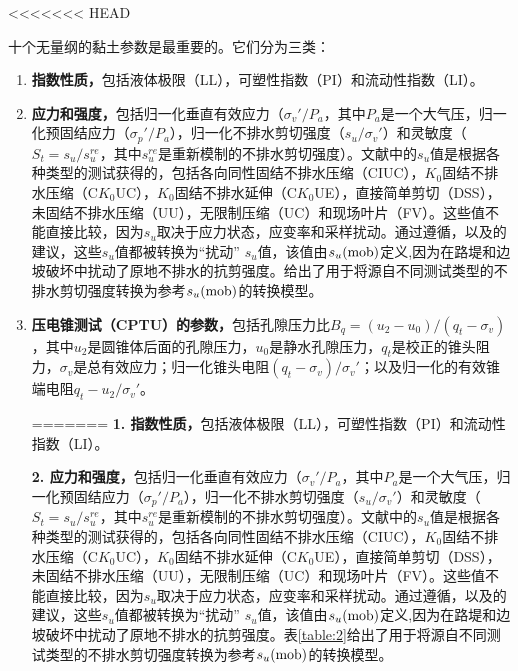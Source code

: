 \begin{paracol}{2}
<<<<<<< HEAD
    \switchcolumn
    
    十个无量纲的黏土参数是最重要的。它们分为三类：
    \begin{enumerate}
        \item \textbf{指数性质，}包括液体极限（LL），可塑性指数（PI）和流动性指数（LI）。
        
        \item \textbf{应力和强度，}包括归一化垂直有效应力（$\sigma_v'/P_a$，其中$P_a$是一个大气压，归一化预固结应力（$\sigma_p'/P_a$），归一化不排水剪切强度（$s_u/\sigma_v'$）和灵敏度（$S_t=s_u/s_u^{re}$，其中$s_u^{re}$是重新模制的不排水剪切强度）。文献中的$s_u$值是根据各种类型的测试获得的，包括各向同性固结不排水压缩（CIUC），$K_0$固结不排水压缩（C$K_0$UC），$K_0$固结不排水延伸（C$K_0$UE），直接简单剪切（DSS），未固结不排水压缩（UU），无限制压缩（UC）和现场叶片（FV）。这些值不能直接比较，因为$s_u$取决于应力状态，应变率和采样扰动。通过遵循\citet{Bjerrum19721}，\citet{Kulhawy1990}以及\citet{Mesri20071}的建议，这些$s_u$值都被转换为“扰动” $s_u$值，该值由$s_u(\rm{mob})$定义,因为在路堤和边坡破坏中扰动了原地不排水的抗剪强度\citep{Mesri20071}。给出了用于将源自不同测试类型的不排水剪切强度转换为参考$s_u(\rm{mob})$的转换模型。
        \item \textbf{压电锥测试（CPTU）的参数，}包括孔隙压力比$B_q=(u_2-u_0)/(q_t-\sigma_v)$，其中$u_2$是圆锥体后面的孔隙压力，$u_0$是静水孔隙压力，$q_t$是校正的锥头阻力，$\sigma_v$是总有效应力；归一化锥头电阻$(q_t-\sigma_v)/\sigma_v'$；以及归一化的有效锥端电阻$q_t-u_2/\sigma_v'$。\par
=======
        \textbf{1. 指数性质，}包括液体极限（LL），可塑性指数（PI）和流动性指数（LI）。

        \textbf{2. 应力和强度，}包括归一化垂直有效应力（$\sigma_v'/P_a$，其中$P_a$是一个大气压，归一化预固结应力（$\sigma_p'/P_a$），归一化不排水剪切强度（$s_u/\sigma_v'$）和灵敏度（$S_t=s_u/s_u^{re}$，其中$s_u^{re}$是重新模制的不排水剪切强度）。文献中的$s_u$值是根据各种类型的测试获得的，包括各向同性固结不排水压缩（CIUC），$K_0$固结不排水压缩（C$K_0$UC），$K_0$固结不排水延伸（C$K_0$UE），直接简单剪切（DSS），未固结不排水压缩（UU），无限制压缩（UC）和现场叶片（FV）。这些值不能直接比较，因为$s_u$取决于应力状态，应变率和采样扰动。通过遵循\citet{Bjerrum19721}，\citet{Kulhawy1990}以及\citet{Mesri20071}的建议，这些$s_u$值都被转换为“扰动” $s_u$值，该值由$s_u(\rm{mob})$定义,因为在路堤和边坡破坏中扰动了原地不排水的抗剪强度\citep{Mesri20071}。表\ref{table:2}给出了用于将源自不同测试类型的不排水剪切强度转换为参考$s_u(\rm{mob})$的转换模型。


\end{enumerate}
\end{paracol}
